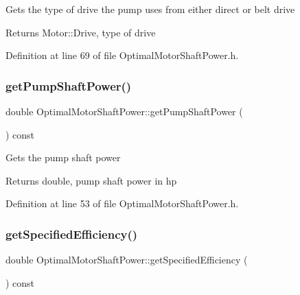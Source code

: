 Gets the type of drive the pump uses from either direct or belt drive \begin{DoxyReturn}{Returns}
Motor\+::\+Drive, type of drive 
\end{DoxyReturn}


Definition at line 69 of file Optimal\+Motor\+Shaft\+Power.\+h.

\mbox{\label{class_optimal_motor_shaft_power_aca7bb632c659ecf2ebf3cb9fdb23626f}} 
\subsubsection{\texorpdfstring{get\+Pump\+Shaft\+Power()}{getPumpShaftPower()}}
{\footnotesize\ttfamily double Optimal\+Motor\+Shaft\+Power\+::get\+Pump\+Shaft\+Power (\begin{DoxyParamCaption}{ }\end{DoxyParamCaption}) const\hspace{0.3cm}{\ttfamily [inline]}}

Gets the pump shaft power \begin{DoxyReturn}{Returns}
double, pump shaft power in hp 
\end{DoxyReturn}


Definition at line 53 of file Optimal\+Motor\+Shaft\+Power.\+h.

\mbox{\label{class_optimal_motor_shaft_power_a89c2038dae30ef58245e810187c2a6c4}} 
\subsubsection{\texorpdfstring{get\+Specified\+Efficiency()}{getSpecifiedEfficiency()}}
{\footnotesize\ttfamily double Optimal\+Motor\+Shaft\+Power\+::get\+Specified\+Efficiency (\begin{DoxyParamCaption}{ }\end{DoxyParamCaption}) const\hspace{0.3cm}{\ttfamily [inline]}}

